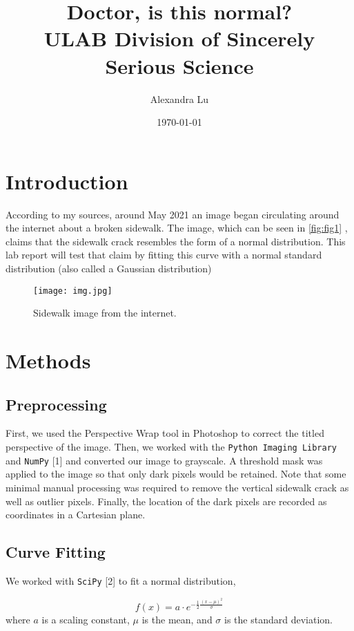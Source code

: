 \documentclass{article}
\title{Doctor, is this normal?\\\large ULAB Division of Sincerely Serious Science}
\author{Alexandra Lu}
\date{\today}
\begin{document}
\maketitle

\section{Introduction}
According to my sources, around May 2021 an image began circulating around the internet about a broken sidewalk. The image, which can be seen in 
\autoref{fig:fig1}
, claims that the sidewalk crack resembles the form of a normal distribution. This lab report will test that claim by fitting this curve with a normal standard distribution (also called a Gaussian distribution)

\begin{figure}[ht]
    \centering
    \texttt{[image: img.jpg]}
    \caption{Sidewalk image from the internet.}
    \label{fig:fig1}
\end{figure}

\section{Methods}
\subsection{Preprocessing}
First, we used the Perspective Wrap tool in Photoshop to correct the titled perspective of the image. Then,
we worked with the \texttt{Python Imaging Library} and \texttt {NumPy} [1] and converted our image to grayscale.
A threshold mask was applied to the image so that only dark pixels would be retained. Note that some
minimal manual processing was required to remove the vertical sidewalk crack as well as outlier pixels.
Finally, the location of the dark pixels are recorded as coordinates in a Cartesian plane.

\pagebreak


\subsection{Curve Fitting}
We worked with \texttt{SciPy} [2] to fit a normal distribution,

\begin{equation}
f(x) = a \cdot e^{-\frac{1}{2} \frac{(x - \mu)^2}{\sigma}}
\end{equation}
where \( a \) is a scaling constant, $\mu$  is the mean, and $\sigma $ is the standard deviation.
\end{document}
